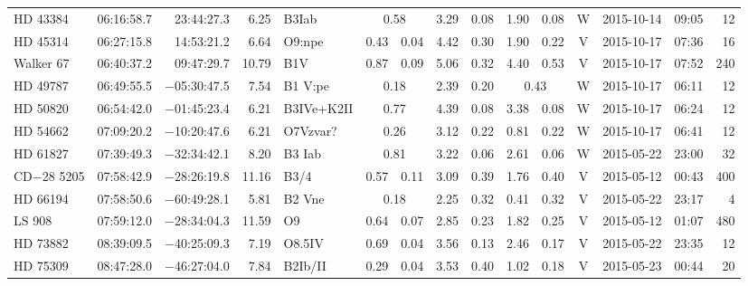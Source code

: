 \begin{tiny}
\begin{longtable}{lrrrll@{$\,\pm$\,}rl@{$\,\pm$\,}rl@{$\,\pm$\,}rcrrr}
HD 43384      &06:16:58.7&     23:44:27.3&        6.25&  B3Iab &\multicolumn{2}{c}{0.58}&    3.29 & 0.08 &      1.90 & 0.08 &    W  &2015-10-14 &09:05&   12\\  %
HD 45314      &06:27:15.8&     14:53:21.2&        6.64&  O9:npe         & 0.43 & 0.04   &    4.42 & 0.30 &      1.90 & 0.22 &    V  &2015-10-17 &07:36&   16\\  %
Walker 67     &06:40:37.2&     09:47:29.7&       10.79&  B1V            & 0.87 & 0.09   &    5.06 & 0.32 &      4.40 & 0.53 &    V  &2015-10-17 &07:52&  240\\  %
HD 49787      &06:49:55.5&  $-$05:30:47.5&        7.54&  B1 V:pe&\multicolumn{2}{c}{0.18}&   2.39 & 0.20 &\multicolumn{2}{c}{0.43}&W&2015-10-17 &06:11&   12\\  %
HD 50820      &06:54:42.0&  $-$01:45:23.4&        6.21&  B3IVe+K2II&\multicolumn{2}{c}{0.77}&4.39 & 0.08 &      3.38 & 0.08 &    W  &2015-10-17 &06:24&   12\\  %
HD 54662      &07:09:20.2&  $-$10:20:47.6&        6.21&  O7Vzvar?&\multicolumn{2}{c}{0.26}&  3.12 & 0.22 &      0.81 & 0.22 &    W  &2015-10-17 &06:41&   12\\  %
HD 61827      &07:39:49.3&  $-$32:34:42.1&        8.20&  B3 Iab&\multicolumn{2}{c}{0.81}&    3.22 & 0.06 &      2.61 & 0.06 &    W  &2015-05-22 &23:00&   32\\  %
CD$-$28 5205  &07:58:42.9&  $-$28:26:19.8&       11.16&  B3/4           & 0.57 & 0.11   &    3.09 & 0.39 &      1.76 & 0.40 &    V  &2015-05-12 &00:43&  400\\  %
HD 66194      &07:58:50.6&  $-$60:49:28.1&        5.81&  B2 Vne&\multicolumn{2}{c}{0.18}&    2.25 & 0.32 &      0.41 & 0.32 &    V  &2015-05-22 &23:17&    4\\  %
LS 908        &07:59:12.0&  $-$28:34:04.3&       11.59&  O9             & 0.64 & 0.07   &    2.85 & 0.23 &      1.82 & 0.25 &    V  &2015-05-12 &01:07&  480\\  %
HD 73882      &08:39:09.5&  $-$40:25:09.3&        7.19&  O8.5IV         & 0.69 & 0.04   &    3.56 & 0.13 &      2.46 & 0.17 &    V  &2015-05-22 &23:35&   12\\  %
HD 75309      &08:47:28.0&  $-$46:27:04.0&        7.84&  B2Ib/II        & 0.29 & 0.04   &    3.53 & 0.40 &      1.02 & 0.18 &    V  &2015-05-23 &00:44&   20\\  %

\end{longtable}
\end{tiny}
